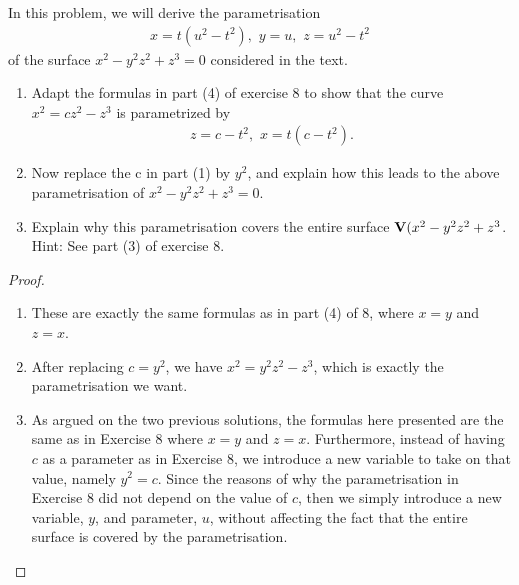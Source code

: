 \begin{exercise}{11}
In this problem, we will derive the parametrisation
\begin{align*}
    x = t(u^2-t^2),\,\, y = u,\,\, z = u^2-t^2
\end{align*}
of the surface $x^2-y^2z^2+z^3=0$ considered in the text.
\begin{enumerate}
    \item Adapt the formulas in part (4) of exercise 8 to show that the curve $x^2 = cz^2-z^3$ is parametrized by 
    \begin{align*}
        z=c-t^2,\,\, x=t(c-t^2).
    \end{align*}
    \item Now replace the c in part (1) by $y^2$, and explain how this leads to the above parametrisation of $x^2-y^2z^2+z^3=0$.
    \item Explain why this parametrisation covers the entire surface $\mathbf{V}(x^2-y^2z^2+z^3$. Hint: See part (3) of exercise 8.
\end{enumerate}
\end{exercise}
\begin{proof}
\begin{enumerate}
    \item These are exactly the same formulas as in part (4) of 8, where $x=y$ and $z=x$. 
    \item After replacing $c=y^2$, we have $x^2=y^2z^2-z^3$, which is exactly the parametrisation we want.
    \item As argued on the two previous solutions, the formulas here presented are the same as in Exercise 8 where $x=y$ and $z=x$. Furthermore, instead of having $c$ as a parameter as in Exercise 8, we introduce a new variable to take on that value, namely $y^2=c$. Since the reasons of why the parametrisation in Exercise 8 did not depend on the value of $c$, then we simply introduce a new variable, $y$, and parameter, $u$, without affecting the fact that the entire surface is covered by the parametrisation.
\end{enumerate}
\end{proof}


